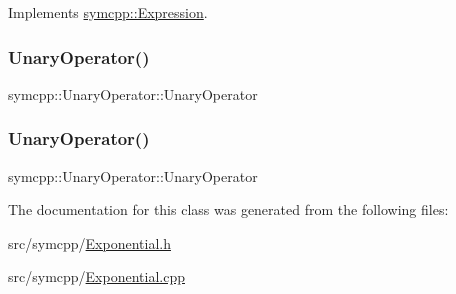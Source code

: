 Implements \mbox{\hyperlink{classsymcpp_1_1Expression_ab1fa6e55eea0682250d013f28db26cd2}{symcpp\+::\+Expression}}.

\mbox{\label{classsymcpp_1_1Exponential_ad3aa899567a080eeb41cb850de310178}} 
\subsubsection{\texorpdfstring{UnaryOperator()}{UnaryOperator()}\hspace{0.1cm}{\footnotesize\ttfamily [1/2]}}
{\footnotesize\ttfamily symcpp\+::\+Unary\+Operator\+::\+Unary\+Operator\hspace{0.3cm}{\ttfamily [inline]}}

\mbox{\label{classsymcpp_1_1Exponential_a23a8172db96675ebf1114f4f3f41b6f1}} 
\subsubsection{\texorpdfstring{UnaryOperator()}{UnaryOperator()}\hspace{0.1cm}{\footnotesize\ttfamily [2/2]}}
{\footnotesize\ttfamily symcpp\+::\+Unary\+Operator\+::\+Unary\+Operator\hspace{0.3cm}{\ttfamily [inline]}}



The documentation for this class was generated from the following files\+:\begin{DoxyCompactItemize}
\item 
src/symcpp/\mbox{\hyperlink{Exponential_8h}{Exponential.\+h}}\item 
src/symcpp/\mbox{\hyperlink{Exponential_8cpp}{Exponential.\+cpp}}\end{DoxyCompactItemize}

